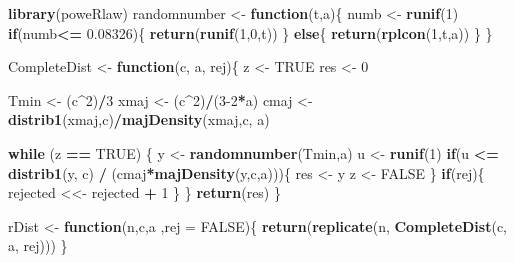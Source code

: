 \documentclass[
]{article}
\newenvironment{Shaded}{\begin{snugshade}}{\end{snugshade}}
\newcommand{\ControlFlowTok}[1]{\textcolor[rgb]{0.13,0.29,0.53}{\textbf{#1}}}
\newcommand{\DataTypeTok}[1]{\textcolor[rgb]{0.13,0.29,0.53}{#1}}
\newcommand{\DecValTok}[1]{\textcolor[rgb]{0.00,0.00,0.81}{#1}}
\newcommand{\FloatTok}[1]{\textcolor[rgb]{0.00,0.00,0.81}{#1}}
\newcommand{\KeywordTok}[1]{\textcolor[rgb]{0.13,0.29,0.53}{\textbf{#1}}}
\newcommand{\NormalTok}[1]{#1}
\newcommand{\OperatorTok}[1]{\textcolor[rgb]{0.81,0.36,0.00}{\textbf{#1}}}
\newcommand{\OtherTok}[1]{\textcolor[rgb]{0.56,0.35,0.01}{#1}}
\newcommand{\StringTok}[1]{\textcolor[rgb]{0.31,0.60,0.02}{#1}}
\begin{document}
\begin{Shaded}
\begin{Highlighting}[]
\KeywordTok{library}\NormalTok{(poweRlaw)}
\NormalTok{randomnumber <-}\StringTok{ }\ControlFlowTok{function}\NormalTok{(t,a)\{}
\NormalTok{  numb <-}\StringTok{ }\KeywordTok{runif}\NormalTok{(}\DecValTok{1}\NormalTok{)}
  \ControlFlowTok{if}\NormalTok{(numb}\OperatorTok{<=}\StringTok{ }\FloatTok{0.08326}\NormalTok{)\{}
    \KeywordTok{return}\NormalTok{(}\KeywordTok{runif}\NormalTok{(}\DecValTok{1}\NormalTok{,}\DecValTok{0}\NormalTok{,t))}
\NormalTok{  \}}
  \ControlFlowTok{else}\NormalTok{\{}
    \KeywordTok{return}\NormalTok{(}\KeywordTok{rplcon}\NormalTok{(}\DecValTok{1}\NormalTok{,t,a))}
\NormalTok{  \}}
\NormalTok{\}}

\NormalTok{CompleteDist <-}\StringTok{ }\ControlFlowTok{function}\NormalTok{(c, a, rej)\{}
\NormalTok{  z <-}\StringTok{ }\OtherTok{TRUE}
\NormalTok{  res <-}\StringTok{ }\DecValTok{0}

\NormalTok{  Tmin <-}\StringTok{ }\NormalTok{(c}\OperatorTok{^}\DecValTok{2}\NormalTok{)}\OperatorTok{/}\DecValTok{3}
\NormalTok{  xmaj <-}\StringTok{ }\NormalTok{(c}\OperatorTok{^}\DecValTok{2}\NormalTok{)}\OperatorTok{/}\NormalTok{(}\DecValTok{3-2}\OperatorTok{*}\NormalTok{a)}
\NormalTok{  cmaj <-}\StringTok{ }\KeywordTok{distrib1}\NormalTok{(xmaj,c)}\OperatorTok{/}\KeywordTok{majDensity}\NormalTok{(xmaj,c, a) }
  
  \ControlFlowTok{while}\NormalTok{ (z }\OperatorTok{==}\StringTok{ }\OtherTok{TRUE}\NormalTok{) \{}
\NormalTok{    y <-}\StringTok{ }\KeywordTok{randomnumber}\NormalTok{(Tmin,a)}
\NormalTok{    u <-}\StringTok{ }\KeywordTok{runif}\NormalTok{(}\DecValTok{1}\NormalTok{)}
    \ControlFlowTok{if}\NormalTok{(u }\OperatorTok{<=}\StringTok{ }\KeywordTok{distrib1}\NormalTok{(y, c) }\OperatorTok{/}\StringTok{ }\NormalTok{(cmaj}\OperatorTok{*}\KeywordTok{majDensity}\NormalTok{(y,c,a)))\{}
\NormalTok{      res <-}\StringTok{ }\NormalTok{y}
\NormalTok{      z <-}\StringTok{ }\OtherTok{FALSE}    
\NormalTok{    \}}
    \ControlFlowTok{if}\NormalTok{(rej)\{}
\NormalTok{    rejected <<-}\StringTok{ }\NormalTok{rejected }\OperatorTok{+}\StringTok{ }\DecValTok{1}
\NormalTok{    \}}
\NormalTok{  \}}
  \KeywordTok{return}\NormalTok{(res)}
\NormalTok{\}}

\NormalTok{rDist <-}\StringTok{ }\ControlFlowTok{function}\NormalTok{(n,c,a ,}\DataTypeTok{rej =} \OtherTok{FALSE}\NormalTok{)\{}
 \KeywordTok{return}\NormalTok{(}\KeywordTok{replicate}\NormalTok{(n, }\KeywordTok{CompleteDist}\NormalTok{(c, a, rej)))}
\NormalTok{\}}
\end{Highlighting}
\end{Shaded}
\end{document}
